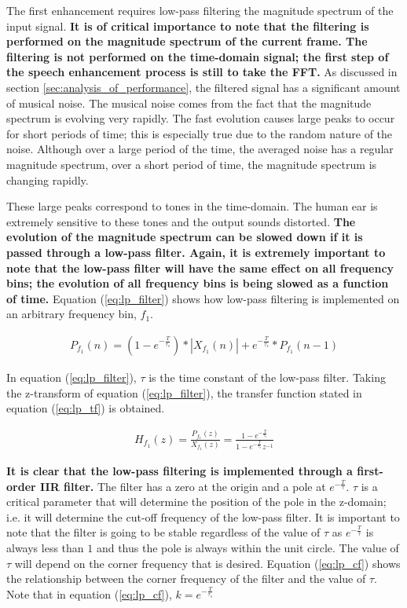 \documentclass[a4paper,pra,twocolumn,10pt,aps,longbibliography,nobalancelastpage]{revtex4-1}
\begin{document}
The first enhancement requires low-pass filtering the magnitude spectrum of the input signal. \textbf{It is of critical importance to note that the filtering is performed on the magnitude spectrum of the current frame. The filtering is not performed on the time-domain signal; the first step of the speech enhancement process is still to take the FFT.} As discussed in section \ref{sec:analysis_of_performance}, the filtered signal has a significant amount of musical noise. The musical noise comes from the fact that the magnitude spectrum is evolving very rapidly. The fast evolution causes large peaks to occur for short periods of time; this is especially true due to the random nature of the noise. Although over a large period of the time, the averaged noise has a regular magnitude spectrum, over a short period of time, the magnitude spectrum is changing rapidly.

These large peaks correspond to tones in the time-domain. The human ear is extremely sensitive to these tones and the output sounds distorted. \textbf{The evolution of the magnitude spectrum can be slowed down if it is passed through a low-pass filter. Again, it is extremely important to note that the low-pass filter will have the same effect on all frequency bins; the evolution of all frequency bins is being slowed as a function of time.} Equation (\ref{eq:lp_filter}) shows how low-pass filtering is implemented on an arbitrary frequency bin, $f_{1}$.

\begin{align}
    P_{f_{1}}(n) = (1 - e^{-\frac{T}{\tau_{s}}})*|X_{f_{1}}(n)| + e^{-\frac{T}{\tau_{s}}}*P_{f_{1}}(n-1)\label{eq:lp_filter}
\end{align}

In equation (\ref{eq:lp_filter}), $\tau$ is the time constant of the low-pass filter. Taking the z-transform of equation (\ref{eq:lp_filter}), the transfer function stated in equation (\ref{eq:lp_tf}) is obtained. 

\begin{align}
    H_{f_{1}}(z) = \frac{P_{f_{1}}(z)}{X_{f_{1}}(z)} = \frac{1 - e^{-\frac{T}{\tau_{s}}}}{1-e^{-\frac{T}{\tau_{s}}}z^{-1}}\label{eq:lp_tf}
\end{align}

\textbf{It is clear that the low-pass filtering is implemented through a first-order IIR filter.} The filter has a zero at the origin and a pole at $e^{-\frac{T}{\tau}}$. $\tau$ is a critical parameter that will determine the position of the pole in the z-domain; i.e. it will determine the cut-off frequency of the low-pass filter. It is important to note that the filter is going to be stable regardless of the value of $\tau$ as $e^{-\frac{T}{\tau}}$ is always less than $1$ and thus the pole is always within the unit circle. The value of $\tau$ will depend on the corner frequency that is desired. Equation (\ref{eq:lp_cf}) shows the relationship between the corner frequency of the filter and the value of $\tau$. Note that in equation (\ref{eq:lp_cf}), $k = e^{-\frac{T}{\tau_{s}}}$
\end{document}
